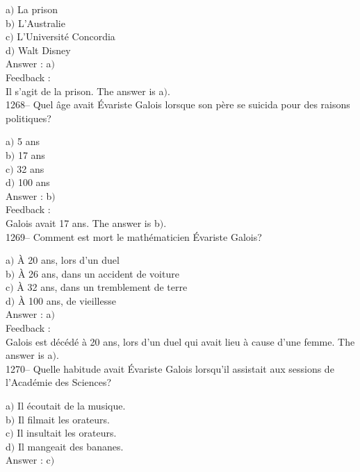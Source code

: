 ﻿\documentclass[letterpaper, 12pt]{article}
\begin{document}
a$)$ La prison \\
b$)$ L'Australie \\
c$)$ L'Universit\'e Concordia \\
d$)$ Walt Disney\\

Answer : a$)$\\

Feedback : \\
Il s'agit de la prison.
The answer is a$)$.\\

1268-- Quel \^age avait \'Evariste Galois lorsque son p\`ere se
suicida pour des raisons politiques?

a$)$ 5 ans \\
b$)$ 17 ans \\
c$)$ 32 ans \\
d$)$ 100 ans\\

Answer : b$)$\\

Feedback : \\
Galois avait 17 ans.
The answer is b$)$.\\

1269-- Comment est mort le math\'ematicien \'Evariste Galois?

a$)$ \`A 20 ans, lors d'un duel \\
b$)$ \`A 26 ans, dans un accident de voiture \\
c$)$ \`A 32 ans, dans un tremblement de terre \\
d$)$ \`A 100 ans, de vieillesse\\

Answer : a$)$\\

Feedback : \\
Galois est d\'ec\'ed\'e \`a 20 ans, lors d'un duel
qui avait lieu \`a cause d'une femme.
The answer is a$)$.\\

1270-- Quelle habitude avait \'Evariste Galois lorsqu'il assistait
aux sessions de l'Acad\'emie des Sciences?

a$)$ Il \'ecoutait de la musique. \\
b$)$ Il filmait les orateurs. \\
c$)$ Il insultait les orateurs. \\
d$)$ Il mangeait des bananes.\\

Answer : c$)$\\
\end{document}
